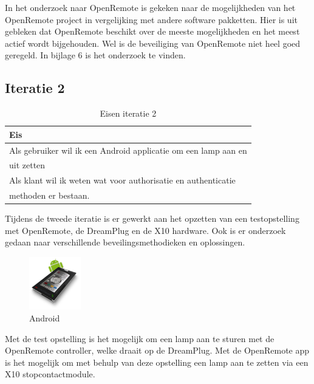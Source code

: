 \documentclass[]{article}
\begin{document}
In het onderzoek naar OpenRemote is gekeken naar de mogelijkheden van het
OpenRemote project in vergelijking met andere software pakketten. Hier is uit
gebleken dat OpenRemote beschikt over de meeste mogelijkheden en het meest
actief wordt bijgehouden. Wel is de beveiliging van OpenRemote niet heel
goed geregeld. In bijlage 6 is het onderzoek te vinden.

\subsection{Iteratie 2}
\begin{table}[htpb]
  \caption{Eisen iteratie 2}
  \begin{center}
    \begin{tabular}{|| l ||}\hline
        Eis                                                              \\\hline\hline
        Als gebruiker wil ik een Android applicatie om een lamp aan en   \\ 
        uit zetten                                                       \\\hline
        Als klant wil ik weten wat voor authorisatie en authenticatie    \\
        methoden er bestaan.                                             \\\hline
    \end{tabular}
  \end{center}
\end{table}

Tijdens de tweede iteratie is er gewerkt aan het opzetten van een
testopstelling met OpenRemote, de DreamPlug en de X10 hardware. Ook is er
onderzoek gedaan naar verschillende beveilingsmethodieken en oplossingen.

\begin{figure}
  \begin{center}
    \includegraphics[width=0.20\textwidth]{android.pdf}
  \end{center}
  \caption{Android}
\end{figure}

Met de test opstelling is het mogelijk om een lamp
aan te sturen met de OpenRemote controller, welke draait op de
DreamPlug. Met de OpenRemote app is het mogelijk om met behulp van deze
opstelling een lamp aan te zetten via een X10 stopcontactmodule.
\end{document}
